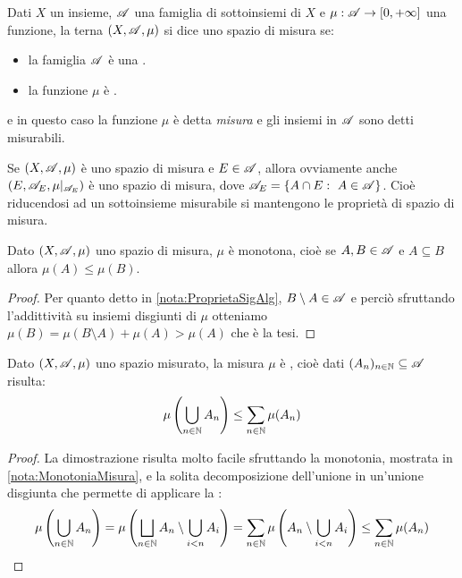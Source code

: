 \begin{definition}
	Dati $X$ un insieme, $\mathscr A$ una famiglia di sottoinsiemi di $X$ e $\mu:\mathscr A\to [0,+\infty]$ una funzione, la terna $(X,\mathscr A, \mu)$ si dice uno spazio di misura se:
	\begin{itemize}
		\item la famiglia $\mathscr A$ è una \sigalg{}.
		\item la funzione $\mu$ è \sigadd{}.
	\end{itemize}
	e in questo caso la funzione $\mu$ è detta \emph{misura} e gli insiemi in $\mathscr A$ sono detti misurabili.
\end{definition}

\begin{remark}\label{nota:RiduzioneMisura}
	Se $(X,\mathscr A,\mu)$ è uno spazio di misura e $E\in\mathscr A$, allora ovviamente anche $(E,\mathscr A_E,\mu|_{\mathscr A_E})$ è uno spazio di misura, dove $\A_E=\{A\cap E:\ A\in\A\}$. Cioè riducendosi ad un sottoinsieme misurabile si mantengono le proprietà di spazio di misura.
\end{remark}

\begin{remark}\label{nota:MonotoniaMisura}
	Dato $(X,\mathscr A,\mu)$ uno spazio di misura, $\mu$ è monotona, cioè se $A,B\in\mathscr A$ e $A\subseteq B$ allora $\mu(A)\le \mu(B)$.
\end{remark}
\begin{proof}
	Per quanto detto in \cref{nota:ProprietaSigAlg}, $B\setminus A\in\mathscr A$ e perciò sfruttando l'addittività su insiemi disgiunti di $\mu$ otteniamo $\mu(B)=\mu(B\setminus A)+\mu(A)>\mu(A)$ che è la tesi.
\end{proof}
\begin{remark}\label{nota:SubAdditivitaMisura}
	Dato $(X,\mathscr A,\mu)$ uno spazio misurato, la misura $\mu$ è \sigsubadd{}, cioè dati $(A_n)_{n\in\mathbb N}\subseteq\mathscr A$ risulta:
	\begin{equation*}
		\mu\left(\bigcup_{n\in\mathbb N} A_n \right)\le \sum_{n\in\mathbb N}\mu(A_n)
	\end{equation*}
\end{remark}
\begin{proof}
	La dimostrazione risulta molto facile sfruttando la monotonia, mostrata in \cref{nota:MonotoniaMisura}, e la solita decomposizione dell'unione in un'unione disgiunta che permette di applicare la \sigadd[ità]:
	\begin{equation*}
		\mu\left(\bigcup_{n\in\mathbb N} A_n \right)=\mu\left(\bigsqcup_{n\in\mathbb N} A_n\setminus\bigcup_{i<n}A_i \right)=
		\sum_{n\in\mathbb N}\mu\left(A_n\setminus\bigcup_{i<n}A_i\right)\le \sum_{n\in\mathbb N}\mu(A_n)
	\end{equation*}
\end{proof}



